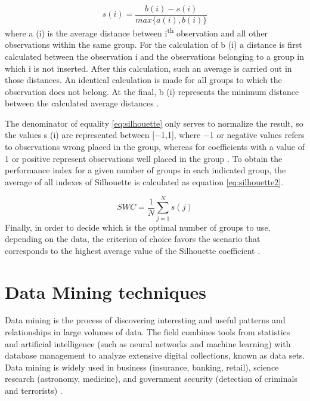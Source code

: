 \begin{equation}
s(i) = \frac{b(i)-s(i)}{max\{a(i),b(i)\}}
\label{eq:silhouette}
\end{equation}
where a (i) is the average distance between i\textsuperscript{th} observation and all other observations within the same group. 
For the calculation of b (i) a distance is first calculated between the observation i and the observations belonging to a group in which i is not inserted. After this calculation, such an average is carried out in those distances. An identical calculation is made for all groups to which the observation does not belong. At the final, b (i) represents the minimum distance between the calculated average distances \cite{Roelofsen2018BusinessAT}.

The denominator of equality \ref{eq:silhouette} only serves to normalize the result, so the values s (i) are represented between [−1,1], where −1 or negative values refers to observations wrong placed in the group, whereas for coefficients with a value of 1 or positive represent observations well placed in the group \cite{Roelofsen2018BusinessAT}. 
To obtain the performance index for a given number of groups in each indicated group, the average of all indexes of Silhouette is calculated as equation \ref{eq:silhouette2}.

\begin{equation}
SWC = \frac{1}{N}\sum_{j=1}^{N}s(j)
\label{eq:silhouette2}
\end{equation}
Finally, in order to decide which is the optimal number of groups to use, depending on the data, the criterion of choice favors the scenario that corresponds to the highest average value of the Silhouette coefficient \cite{Roelofsen2018BusinessAT}.


\section{Data Mining techniques}

Data mining is the process of discovering interesting and useful patterns and relationships in large volumes of data. The field combines tools from statistics and artificial intelligence (such as neural networks and machine learning) with database management to analyze extensive digital collections, known as data sets. Data mining is widely used in business (insurance, banking, retail), science research (astronomy, medicine), and government security (detection of criminals and terrorists) \cite{Okonkwo2011COMBATINGCA}. 

